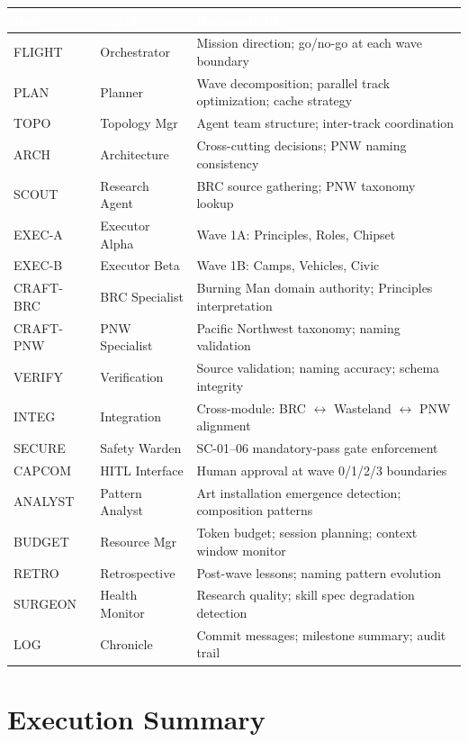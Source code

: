 \documentclass[11pt,letterpaper]{article}
\newcommand{\tableheader}[1]{\textbf{\sffamily\textcolor{white}{#1}}}
\begin{document}
\begin{center}
\begin{tabularx}{\textwidth}{L{2.5cm}L{3cm}X}
\toprule
{}
\tableheader{Role} & \tableheader{Agent} & \tableheader{Responsibility} \\
\midrule
FLIGHT & Orchestrator & Mission direction; go/no-go at each wave boundary \\
PLAN & Planner & Wave decomposition; parallel track optimization; cache strategy \\
TOPO & Topology Mgr & Agent team structure; inter-track coordination \\
ARCH & Architecture & Cross-cutting decisions; PNW naming consistency \\
SCOUT & Research Agent & BRC source gathering; PNW taxonomy lookup \\
EXEC-A & Executor Alpha & Wave 1A: Principles, Roles, Chipset \\
EXEC-B & Executor Beta & Wave 1B: Camps, Vehicles, Civic \\
CRAFT-BRC & BRC Specialist & Burning Man domain authority; Principles interpretation \\
CRAFT-PNW & PNW Specialist & Pacific Northwest taxonomy; naming validation \\
VERIFY & Verification & Source validation; naming accuracy; schema integrity \\
INTEG & Integration & Cross-module: BRC $\leftrightarrow$ Wasteland $\leftrightarrow$ PNW alignment \\
SECURE & Safety Warden & SC-01--06 mandatory-pass gate enforcement \\
CAPCOM & HITL Interface & Human approval at wave 0/1/2/3 boundaries \\
ANALYST & Pattern Analyst & Art installation emergence detection; composition patterns \\
BUDGET & Resource Mgr & Token budget; session planning; context window monitor \\
RETRO & Retrospective & Post-wave lessons; naming pattern evolution \\
SURGEON & Health Monitor & Research quality; skill spec degradation detection \\
LOG & Chronicle & Commit messages; milestone summary; audit trail \\
\bottomrule
\end{tabularx}
\end{center}

\section{Execution Summary}
\end{document}
